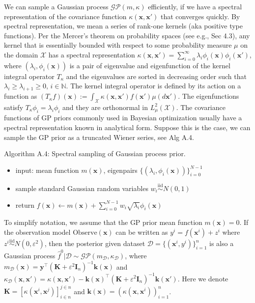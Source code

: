 \documentclass{article}
\begin{document}
We can sample a Gaussian process $\mathcal{GP}(m, \kappa)$
efficiently, if we have a spectral representation of the covariance
function $\kappa(\mathbf{x}, \mathbf{x}')$ that converges quickly. By
spectral representation, we mean a series of rank-one kernels (aka
positive type functions). Per the Mercer's theorem on probability spaces
(see e.g., \cite{Rasmussen2006} Sec 4.3), any kernel that is
essentially bounded with respect to some probability measure $\mu$ on
the domain $\mathcal{X}$ has a spectral representation
$\kappa(\mathbf{x}, \mathbf{x}') = \sum_{i=0}^\infty \lambda_i \phi_i(\mathbf{x}) \phi_i(\mathbf{x}')$,
where $(\lambda_i, \phi_i(\mathbf{x}))$ is a pair of eigenvalue and
eigenfunction of the kernel integral operator $T_\kappa$ and the
eigenvalues are sorted in decreasing order such that
$\lambda_i \ge \lambda_{i+1} \ge 0$, $i \in \mathbb{N}$. The kernel
integral operator is defined by its action on a function as
$(T_\kappa f)(\mathbf{x}) := \int_{\mathcal{X}} \kappa(\mathbf{x}, \mathbf{x}') f(\mathbf{x}') \mu(d \mathbf{x}')$.
The eigenfunctions satisfy $T_\kappa \phi_i = \lambda_i \phi_i$ and
they are orthonormal in $L^2_\mu(\mathcal{X})$. The covariance
functions of GP priors commonly used in Bayesian optimization usually
have a spectral representation known in analytical form. Suppose this is
the case, we can sample the GP prior as a truncated Wiener series, see
Alg A.4.

Algorithm A.4: Spectral sampling of Gaussian process prior.

\begin{itemize}

\item
  input: mean function $m(\mathbf{x})$, eigenpairs
  $\{(\lambda_i, \phi_i(\mathbf{x}))\}_{i=0}^{N-1}$
\item
  sample standard Gaussian random variables
  $w_i \overset{\text{iid}}{\sim} N(0,1)$
\item
  return
  $f(\mathbf{x}) \gets m(\mathbf{x}) + \sum_{i=0}^{N-1} w_i \sqrt{\lambda_i} \phi_i(\mathbf{x})$
\end{itemize}

To simplify notation, we assume that the GP prior mean function
$m(\mathbf{x}) = 0$. If the observation model
$\mathrm{Observe}(\mathbf{x})$ can be written as
$y^i = f(\mathbf{x}^i) + z^i$ where
$z^i \overset{\text{iid}}{\sim} N(0, \varepsilon^2)$, then the
posterior given dataset
$\mathcal{D} = \{(\mathbf{x}^i, y^i)\}_{i=1}^n$ is also a Gaussian
process
$\widehat{f}^0 | \mathcal{D} \sim \mathcal{GP}(m_{\mathcal{D}}, \kappa_{\mathcal{D}})$,
where
$m_{\mathcal{D}}(\mathbf{x}) = \mathbf{y}^\intercal (\mathbf{K} + \varepsilon^2 \mathbf{I}_n)^{-1} \mathbf{k}(\mathbf{x})$
and
$\kappa_{\mathcal{D}}(\mathbf{x}, \mathbf{x}') = \kappa(\mathbf{x}, \mathbf{x}') - \mathbf{k}(\mathbf{x})^\intercal (\mathbf{K} + \varepsilon^2 \mathbf{I}_n)^{-1} \mathbf{k}(\mathbf{x}')$.
Here we denote
$\mathbf{K} = [\kappa(\mathbf{x}^i, \mathbf{x}^j)]_{i \in n}^{j \in n}$
and
$\mathbf{k}(\mathbf{x}) = (\kappa(\mathbf{x}, \mathbf{x}^i))_{i=1}^n$.
\end{document}
